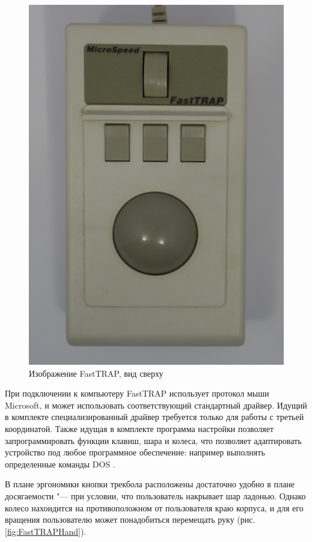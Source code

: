 \documentclass[11pt, a4paper]{article}
\begin{document}
\begin{figure}[h]
    \centering
    \includegraphics[scale=0.3]{1987_microspeed_fasttrap/fast3.png}
    \caption{Изображение FastTRAP, вид сверху}
    \label{fig:FastTRAPTop}
\end{figure}

При подключении к компьютеру FastTRAP использует протокол мыши Microsoft, и может использовать соответствующий стандартный драйвер. Идущий в комплекте специализированный драйвер требуется только для работы с третьей координатой. Также идущая в комплекте программа настройки позволяет запрограммировать функции клавиш, шара и колеса, что позволяет адаптировать устройство под любое программное обеспечение: например выполнять определенные команды DOS \cite{fast}.

В плане эргономики кнопки трекбола расположены достаточно удобно в плане досягаемости "--- при условии, что пользователь накрывает шар ладонью. Однако колесо нахоидится на противоположном от пользователя краю корпуса, и для его вращения пользователю может понадобиться перемещать руку (рис. \ref{fig:FastTRAPHand}).
\end{document}
